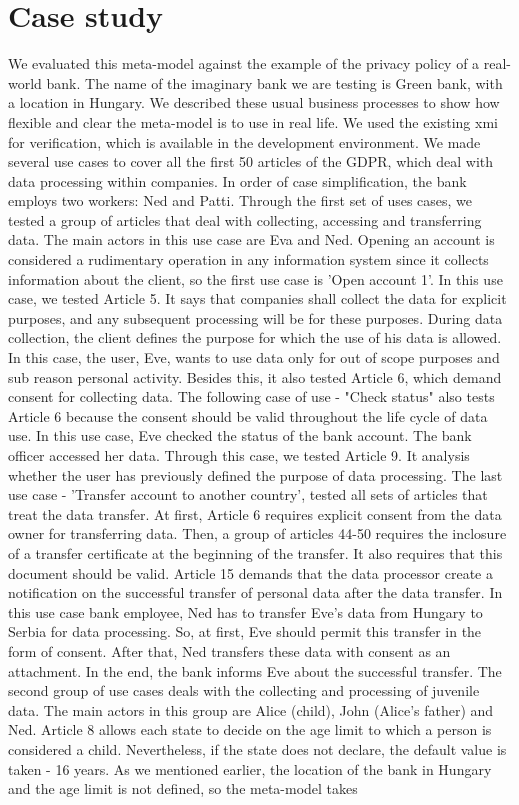 \documentclass[11pt,english]{article}
\begin{document}
\section{Case study}
We evaluated this meta-model against the example of the privacy policy of a real-world bank. The name of the imaginary bank we are testing is Green bank, with a location in Hungary. We described these usual business processes to show how flexible and clear the meta-model is to use in real life. We used the existing xmi for verification, which is available in the development environment. We made several use cases to cover all the first 50 articles of the GDPR, which deal with data processing within companies. In order of case simplification, the bank employs two workers: Ned and Patti. \newline Through the first set of uses cases, we tested a group of articles that deal with collecting, accessing and transferring data. The main actors in this use case are Eva and Ned. Opening an account is considered a rudimentary operation in any information system since it collects information about the client, so the first use case is 'Open account 1'. In this use case, we tested Article 5. It says that companies shall collect the data for explicit purposes, and any subsequent processing will be for these purposes. During data collection, the client defines the purpose for which the use of his data is allowed. In this case, the user, Eve, wants to use data only for out of scope purposes and sub reason personal activity. Besides this, it also tested Article 6, which demand consent for collecting data. The following case of use - "Check status" also tests Article 6 because the consent should be valid throughout the life cycle of data use. In this use case, Eve checked the status of the bank account. The bank officer accessed her data. Through this case, we tested Article 9. It analysis whether the user has previously defined the purpose of data processing. The last use case - 'Transfer account to another country', tested all sets of articles that treat the data transfer. At first, Article 6 requires explicit consent from the data owner for transferring data. Then, a group of articles 44-50 requires the inclosure of a transfer certificate at the beginning of the transfer. It also requires that this document should be valid. Article 15 demands that the data processor create a notification on the successful transfer of personal data after the data transfer. In this use case bank employee, Ned has to transfer Eve's data from Hungary to Serbia for data processing. So, at first, Eve should permit this transfer in the form of consent. After that, Ned transfers these data with consent as an attachment. In the end, the bank informs Eve about the successful transfer. \newline The second group of use cases deals with the collecting and processing of juvenile data. The main actors in this group are Alice (child), John (Alice's father) and Ned. Article 8 allows each state to decide on the age limit to which a person is considered a child. Nevertheless, if the state does not declare, the default value is taken - 16 years. As we mentioned earlier, the location of the bank in Hungary and the age limit is not defined, so the meta-model takes 
\end{document}
